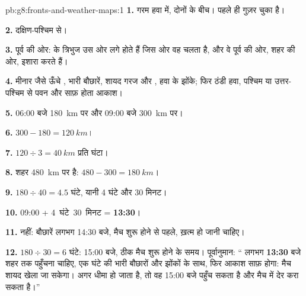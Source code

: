 \begin{solution}{pb:g8:fronts-and-weather-maps:1}
\textbf{1.} गरम हवा में, दोनों  के बीच।  पहले ही गुज़र चुका
है।

\textbf{2.} दक्षिण-पश्चिम से।

\textbf{3.} पूर्व की ओर:  के त्रिभुज उस ओर लगे होते हैं जिस ओर वह चलता है,
और वे पूर्व की ओर, शहर की ओर, इशारा करते हैं।

\textbf{4.} मीनार जैसे ऊँचे , भारी बौछारें, शायद गरज और , हवा के झोंके; फिर
ठंडी हवा, पश्चिम या उत्तर-पश्चिम से पवन और साफ़ होता
आकाश।

\textbf{5.} 06:00 बजे \qty{180}{km} पर और 09:00 बजे \qty{300}{km} पर।

\textbf{6.} $300 - 180 = \qty{120}{km}$।

\textbf{7.} $120 \div 3 = \qty{40}{km}$ प्रति घंटा।

\textbf{8.} शहर \qty{480}{km} पर है: $480 - 300 = \qty{180}{km}$।

\textbf{9.} $180 \div 40 = 4.5$ घंटे, यानी 4 घंटे और 30 मिनट।

\textbf{10.} 09:00 + 4~घंटे~30~मिनट = \textbf{13:30}।

\textbf{11.} नहीं: बौछारें लगभग 14:30 बजे, मैच शुरू होने से पहले, ख़त्म हो जानी
चाहिए।

\textbf{12.} $180 \div 30 = 6$ घंटे: 15:00 बजे, ठीक मैच शुरू होने के समय।
पूर्वानुमान: `` लगभग \textbf{13:30} बजे शहर तक पहुँचना चाहिए, एक घंटे की
भारी बौछारों और झोंकों के साथ, फिर आकाश साफ़ होगा: मैच शायद खेला जा सकेगा। अगर 
धीमा हो जाता है, तो वह 15:00 बजे पहुँच सकता है और मैच में देर करा सकता
है।''
\end{solution}
